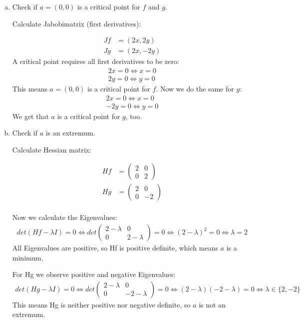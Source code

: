 \documentclass[11pt,a4paper]{article}
\begin{document}
\begin{enumerate}[a)]

\item Check if $a=(0,0)$ is a critical point for $f$ and $g$.

Calculate Jabobimatrix (first derivatives):

\begin{align*}
	Jf &= (2x, 2y) \\
	Jg &= (2x, -2y)
\end{align*} 
A critical point requires all first derivatives to be zero:
\begin{align*}
	2x = 0 \Leftrightarrow x = 0 \\
	2y = 0 \Leftrightarrow y = 0
\end{align*} 
This means $a = (0,0)$ is a critical point for $f$. Now we do the same for $g$:
\begin{align*}
	2x = 0 \Leftrightarrow x = 0 \\
	-2y = 0 \Leftrightarrow y = 0
\end{align*}
We get that $a$ is a critical point for $g$, too.

\item Check if $a$ is an extremum.

Calculate Hessian matrix:

\begin{align*}
	Hf &= \left(\begin{array}{ccc}
		2 & 0 \\
		0 & 2
		\end{array} \right) \\
	Hg &= \left(\begin{array}{ccc}
		2 & 0 \\
		0 & -2
		\end{array} \right) \\
\end{align*}

Now we calculate the Eigenvalues:
\begin{align*}
	det(Hf - \lambda I) = 0 
	\Leftrightarrow det \left(\begin{array}{ccc} 2-\lambda & 0 \\ 0 & 2-\lambda \end{array} \right) = 0
	\Leftrightarrow (2-\lambda)^2 = 0
	\Leftrightarrow \lambda = 2
\end{align*}
All Eigenvalues are positive, so Hf is positive definite, which means $a$ is a minimum.

For Hg we observe positive and negative Eigenvalues:
\begin{align*}
	det(Hg - \lambda I) = 0 
	\Leftrightarrow det \left(\begin{array}{ccc} 2-\lambda & 0 \\ 0 & -2-\lambda \end{array} \right) = 0
	\Leftrightarrow (2-\lambda)(-2-\lambda) = 0
	\Leftrightarrow \lambda \in \{2,-2\}
\end{align*}
This means Hg is neither positive nor negative definite, so $a$ is not an extremum.

\end{enumerate}
\end{document}
